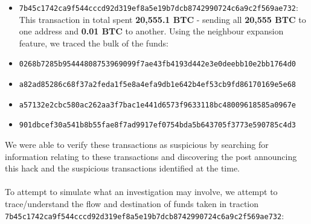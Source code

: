 \begin{itemize}
\item \texttt{7b45c1742ca9f544cccd92d319ef8a5e19b7dcb8742990724c6a9c2f569ae732}: This transaction in total spent \textbf{20,555.1 BTC} - sending all \textbf{20,555 BTC} to one address and \textbf{0.01 BTC} to another. Using the neighbour expansion feature, we traced the bulk of the funds: 

\item \texttt{0268b7285b95444808753969099f7ae43fb4193d442e3e0deebb10e2bb1764d0}

\item \texttt{a82ad85286c68f37a2feda1f5e8a4efa9db1e642b4ef53cb9fd86170169e5e68}
\item \texttt{a57132e2cbc580ac262aa3f7bac1e441d6573f9633118bc48009618585a0967e}
\item \texttt{901dbcef30a541b8b55fae8f7ad9917ef0754bda5b643705f3773e590785c4d3}
\end{itemize}
We were able to verify these transactions as suspicious by searching for information relating to these transactions and discovering the post announcing this hack and the suspicious transactions identified at the time. 
\\\\
To attempt to simulate what an investigation may involve, we attempt to trace/understand the flow and destination of funds taken in traction \\\texttt{7b45c1742ca9f544cccd92d319ef8a5e19b7dcb8742990724c6a9c2f569ae732}:
